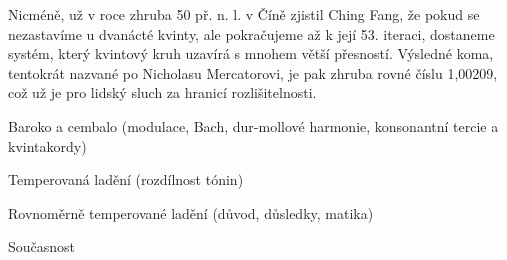 \documentclass[12pt]{article}
\begin{document}
Nicméně, už v roce zhruba 50 př. n. l. v Číně zjistil Ching Fang, že pokud se nezastavíme u dvanácté kvinty, ale pokračujeme až k její 53. iteraci, dostaneme systém, který kvintový kruh uzavírá s mnohem větší přesností. Výsledné koma, tentokrát nazvané po Nicholasu Mercatorovi, je pak zhruba rovné číslu 1,00209, což už je pro lidský sluch za hranicí rozlišitelnosti.

\pagebreak

Baroko a cembalo (modulace, Bach, dur-mollové harmonie, konsonantní tercie a kvintakordy)

Temperovaná ladění (rozdílnost tónin)

Rovnoměrně temperované ladění (důvod, důsledky, matika)

Současnost


{}

\end{document}
